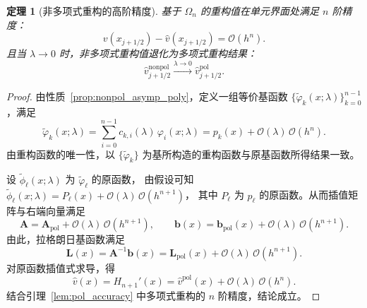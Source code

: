 \documentclass[12pt,a4paper]{article}
\newtheorem{theorem}{定理}[section]
\numberwithin{equation}{section}    %
\begin{document}
\begin{theorem}[非多项式重构的高阶精度]
    \label{thm:nonpol_accuracy}
    基于 $\Omega_n$ 的重构值在单元界面处满足 $n$ 阶精度：
    \begin{equation}
        v(x_{j+1/2}) - \hat{v}(x_{j+1/2}) = \mathcal{O}(h^n).
    \end{equation}
    且当 $\lambda \to 0$ 时，非多项式重构值退化为多项式重构结果：
    \begin{equation}
        \hat{v}_{j+1/2}^{\mathrm{nonpol}} \xrightarrow{\lambda \to 0} \hat{v}_{j+1/2}^{\mathrm{pol}}.
    \end{equation}
\end{theorem}

\begin{proof}
    由性质~\ref{prop:nonpol_asymp_poly}，定义一组等价基函数
    $\{\tilde{\varphi}_k(x;\lambda)\}_{k=0}^{n-1}$，满足
    \begin{equation}
        \tilde{\varphi}_k(x;\lambda)
        = \sum_{i=0}^{n-1} c_{k,i}(\lambda)\,\varphi_i(x;\lambda)
        = p_k(x) + \mathcal{O}(\lambda)\,\mathcal{O}(h^n).
    \end{equation}
    由重构函数的唯一性，以 $\{\tilde{\varphi}_k\}$ 为基所构造的重构函数与原基函数所得结果一致。

    设 $\tilde{\phi}_\ell(x;\lambda)$ 为 $\tilde{\varphi}_\ell$ 的原函数，
    由假设可知
    $\tilde{\phi}_\ell(x;\lambda) = P_\ell(x) + \mathcal{O}(\lambda)\,\mathcal{O}(h^{n+1})$，
    其中 $P_\ell$ 为 $p_\ell$ 的原函数。从而插值矩阵与右端向量满足
    \begin{equation}
        \bm{A} = \bm{A}_{\mathrm{pol}} + \mathcal{O}(\lambda)\,\mathcal{O}(h^{n+1}),
        \qquad
        \bm{b}(x) = \bm{b}_{\mathrm{pol}}(x) + \mathcal{O}(\lambda)\,\mathcal{O}(h^{n+1}).
    \end{equation}
    由此，拉格朗日基函数满足
    \begin{equation}
        \bm{L}(x) = \bm{A}^{-1}\bm{b}(x)
        = \bm{L}_{\mathrm{pol}}(x) + \mathcal{O}(\lambda)\,\mathcal{O}(h^{n+1}).
    \end{equation}
    对原函数插值式求导，得
    \begin{equation}
        \hat{v}(x) = H_{n+1}'(x)
        = \hat{v}^{\mathrm{pol}}(x) + \mathcal{O}(\lambda)\,\mathcal{O}(h^n).
    \end{equation}
    结合引理~\ref{lem:pol_accuracy} 中多项式重构的 $n$ 阶精度，结论成立。
\end{proof}
\end{document}
